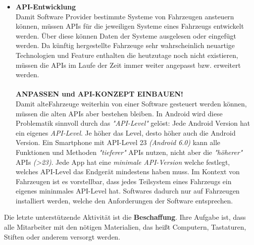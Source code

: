 \begin{itemize}
	\item[] \hspace{-0.6cm} \textbf{API-Entwicklung}\\
	Damit Software Provider bestimmte Systeme von Fahrzeugen ansteuern können, müssen APIs für die jeweiligen Systeme eines Fahrzeugs entwickelt werden. Über diese können Daten der Systeme ausgelesen oder eingefügt werden. Da künftig hergestellte Fahrzeuge sehr wahrscheinlich neuartige Technologien und Feature enthalten die heutzutage noch nicht existieren, müssen die APIs im Laufe der Zeit immer weiter angepasst bzw. erweitert werden.\\\\
	\textbf{ANPASSEN und API-KONZEPT EINBAUEN!}\\
	Damit \glqq alte\grqq Fahrzeuge weiterhin von einer Software gesteuert werden können, müssen die alten APIs aber bestehen bleiben. In Android wird diese Problematik sinnvoll durch das \textit{"API-Level"} gelöst: Jede Android Version hat ein eigenes \textit{API-Level}. Je höher das Level, desto höher auch die Android Version. Ein Smartphone mit API-Level 23 \textit{(Android 6.0)} kann alle Funktionen und Methoden \textit{"tieferer"} APIs nutzen, nicht aber die \textit{"höherer"} APIs \textit{(>23)}. Jede App hat eine \textit{minimale API-Version} welche festlegt, welches API-Level das Endgerät mindestens haben muss. Im Kontext von Fahrzeugen ist es vorstellbar, dass jedes Teilsystem eines Fahrzeugs ein eigenes mininmales API-Level hat. Softwares dadurch nur auf Fahrzeugen installiert werden, welche den Anforderungen der Software entsprechen. 
\end{itemize}

Die letzte unterstützende Aktivität ist die \textbf{Beschaffung}. Ihre Aufgabe ist, dass alle Mitarbeiter mit den nötigen Materialien, das heißt Computern, Tastaturen, Stiften oder anderem versorgt werden.\\\\